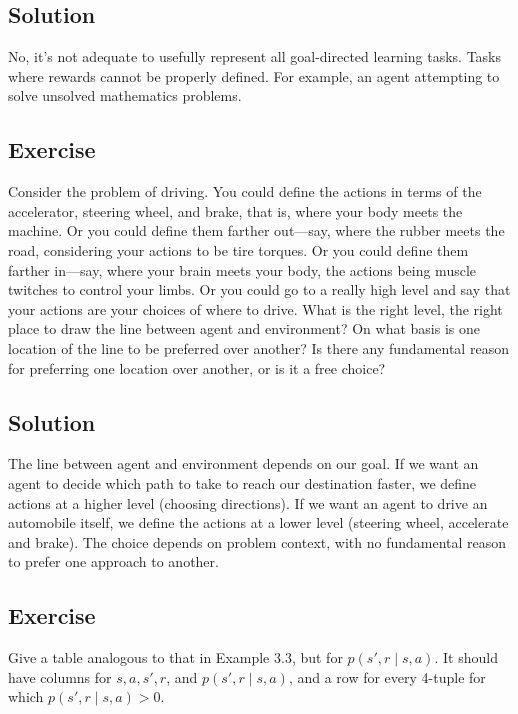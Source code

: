 \documentclass[11pt]{article}
\begin{document}
	\subsection*{Solution}
	No, it's not adequate to usefully represent all goal-directed learning tasks. Tasks where rewards cannot be properly defined. For example, an agent attempting to solve unsolved mathematics problems.
	
	\subsection{}
	\subsection*{Exercise}
	Consider the problem of driving. You could define the actions in terms of the accelerator, steering wheel, and brake, that is, where your body meets the machine.
	Or you could define them farther out—say, where the rubber meets the road, considering
	your actions to be tire torques. Or you could define them farther in—say, where your
	brain meets your body, the actions being muscle twitches to control your limbs. Or you
	could go to a really high level and say that your actions are your choices of where to drive.
	What is the right level, the right place to draw the line between agent and environment?
	On what basis is one location of the line to be preferred over another? Is there any
	fundamental reason for preferring one location over another, or is it a free choice?
	\subsection*{Solution}
	The line between agent and environment depends on our goal. If we want an agent to decide which path to take to reach our destination faster, we define actions at a higher level (choosing directions). If we want an agent to drive an automobile itself, we define the actions at a lower level (steering wheel, accelerate and brake). The choice depends on problem context, with no fundamental reason to prefer one approach to another.
	
	\subsection{}
	\subsection*{Exercise}
	Give a table analogous to that in Example 3.3, but for $p(s', r\mid s, a)$. It
	should have columns for $s, a, s', r$, and $p(s', r\mid s, a)$, and a row for every 4-tuple for which
	$p(s', r\mid s, a) > 0$.
\end{document}
